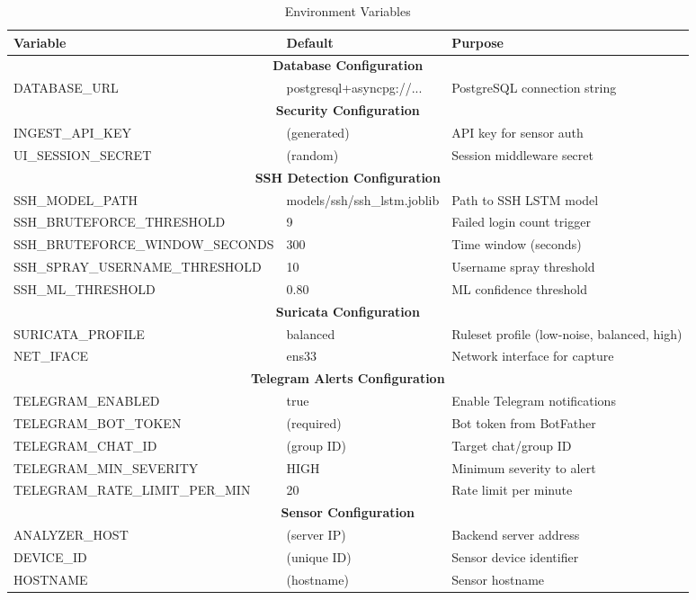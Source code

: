 \documentclass[12pt,a4paper]{report} %
\begin{document}
\begin{table}[H]
	\centering
	\caption{Environment Variables}
	\label{tab:env-vars}
	\begin{tabular}{|l|l|p{4cm}|}
		\hline
		\textbf{Variable} & \textbf{Default} & \textbf{Purpose} \\
		\hline
		\multicolumn{3}{|c|}{\textbf{Database Configuration}} \\
		\hline
		DATABASE\_URL & postgresql+asyncpg://... & PostgreSQL connection string \\
		\hline
		\multicolumn{3}{|c|}{\textbf{Security Configuration}} \\
		\hline
		INGEST\_API\_KEY & (generated) & API key for sensor auth \\
		UI\_SESSION\_SECRET & (random) & Session middleware secret \\
		\hline
		\multicolumn{3}{|c|}{\textbf{SSH Detection Configuration}} \\
		\hline
		SSH\_MODEL\_PATH & models/ssh/ssh\_lstm.joblib & Path to SSH LSTM model \\
		SSH\_BRUTEFORCE\_THRESHOLD & 9 & Failed login count trigger \\
		SSH\_BRUTEFORCE\_WINDOW\_SECONDS & 300 & Time window (seconds) \\
		SSH\_SPRAY\_USERNAME\_THRESHOLD & 10 & Username spray threshold \\
		SSH\_ML\_THRESHOLD & 0.80 & ML confidence threshold \\
		\hline
		\multicolumn{3}{|c|}{\textbf{Suricata Configuration}} \\
		\hline
		SURICATA\_PROFILE & balanced & Ruleset profile (low-noise, balanced, high) \\
		NET\_IFACE & ens33 & Network interface for capture \\
		\hline
		\multicolumn{3}{|c|}{\textbf{Telegram Alerts Configuration}} \\
		\hline
		TELEGRAM\_ENABLED & true & Enable Telegram notifications \\
		TELEGRAM\_BOT\_TOKEN & (required) & Bot token from BotFather \\
		TELEGRAM\_CHAT\_ID & (group ID) & Target chat/group ID \\
		TELEGRAM\_MIN\_SEVERITY & HIGH & Minimum severity to alert \\
		TELEGRAM\_RATE\_LIMIT\_PER\_MIN & 20 & Rate limit per minute \\
		\hline
		\multicolumn{3}{|c|}{\textbf{Sensor Configuration}} \\
		\hline
		ANALYZER\_HOST & (server IP) & Backend server address \\
		DEVICE\_ID & (unique ID) & Sensor device identifier \\
		HOSTNAME & (hostname) & Sensor hostname \\
		\hline
	\end{tabular}
\end{table}
\end{document}

